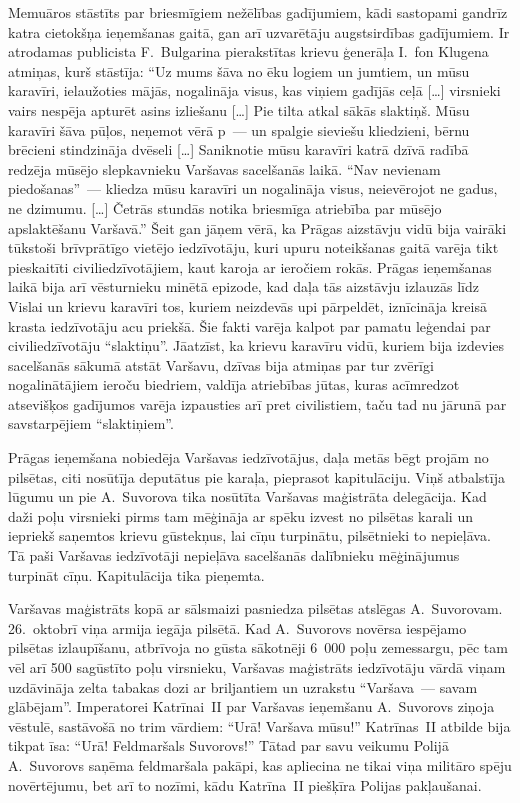 \documentclass[twoside,a5paper,12pt,fleqn,openany]{extbook}
\newcommand{\citespace}{[\dots{}]}
\begin{document}
Memuāros stāstīts par briesmīgiem nežēlības gadījumiem, kādi sastopami gandrīz katra cietokšņa ieņemšanas gaitā, gan arī uzvarētāju augstsirdības gadījumiem. Ir atrodamas publicista F.~Bulgarina pierakstītas krievu ģenerāļa I.~fon Klugena atmiņas, kurš stāstīja: ``Uz mums šāva no ēku logiem un jumtiem, un mūsu karavīri, ielaužoties mājās, nogalināja visus, kas viņiem gadījās ceļā \citespace{} virsnieki vairs nespēja apturēt asins izliešanu \citespace{} Pie tilta atkal sākās slaktiņš. Mūsu karavīri šāva pūļos, neņemot vērā p~--- un spalgie sieviešu kliedzieni, bērnu brēcieni stindzināja dvēseli \citespace{} Saniknotie mūsu karavīri katrā dzīvā radībā redzēja mūsējo slepkavnieku Varšavas sacelšanās laikā. ``Nav nevienam piedošanas''~--- kliedza mūsu karavīri un nogalināja visus, neievērojot ne gadus, ne dzimumu. \citespace{} Četrās stundās notika briesmīga atriebība par mūsējo apslaktēšanu Varšavā.'' Šeit gan jāņem vērā, ka Prāgas aizstāvju vidū bija vairāki tūkstoši brīvprātīgo vietējo iedzīvotāju, kuri upuru noteikšanas gaitā varēja tikt pieskaitīti civiliedzīvotājiem, kaut karoja ar ieročiem rokās. Prāgas ieņemšanas laikā bija arī vēsturnieku minētā epizode, kad daļa tās aizstāvju izlauzās līdz Vislai un krievu karavīri tos, kuriem neizdevās upi pārpeldēt, iznīcināja kreisā krasta iedzīvotāju acu priekšā. Šie fakti varēja kalpot par pamatu leģendai par civiliedzīvotāju ``slaktiņu''. Jāatzīst, ka krievu karavīru vidū, kuriem bija izdevies sacelšanās sākumā atstāt Varšavu, dzīvas bija atmiņas par tur zvērīgi nogalinātājiem ieroču biedriem, valdīja atriebības jūtas, kuras acīmredzot atsevišķos gadījumos varēja izpausties arī pret civilistiem, taču tad nu jārunā par savstarpējiem ``slaktiņiem''.

Prāgas ieņemšana nobiedēja Varšavas iedzīvotājus, daļa metās bēgt projām no pilsētas, citi nosūtīja deputātus pie karaļa, pieprasot kapitulāciju. Viņš atbalstīja lūgumu un pie A.~Suvorova tika nosūtīta Varšavas maģistrāta delegācija. Kad daži poļu virsnieki pirms tam mēģināja ar spēku izvest no pilsētas karali un iepriekš saņemtos krievu gūstekņus, lai cīņu turpinātu, pilsētnieki to nepieļāva. Tā paši Varšavas iedzīvotāji nepieļāva sacelšanās dalībnieku mēģinājumus turpināt cīņu. Kapitulācija tika pieņemta.

Varšavas maģistrāts kopā ar sālsmaizi pasniedza pilsētas atslēgas A.~Suvorovam. 26.~oktobrī viņa armija iegāja pilsētā. Kad A.~Suvorovs novērsa iespējamo pilsētas izlaupīšanu, atbrīvoja no gūsta sākotnēji 6~000 poļu zemessargu, pēc tam vēl arī 500 sagūstīto poļu virsnieku, Varšavas maģistrāts iedzīvotāju vārdā viņam uzdāvināja zelta tabakas dozi ar briljantiem un uzrakstu ``Varšava~--- savam glābējam''. Imperatorei Katrīnai~II par Varšavas ieņemšanu A.~Suvorovs ziņoja vēstulē, sastāvošā no trim vārdiem: ``Urā! Varšava mūsu!'' Katrīnas~II atbilde bija tikpat īsa: ``Urā! Feldmaršals Suvorovs!'' Tātad par savu veikumu Polijā A.~Suvorovs saņēma feldmaršala pakāpi, kas apliecina ne tikai viņa militāro spēju novērtējumu, bet arī to nozīmi, kādu Katrīna~II piešķīra Polijas pakļaušanai.
\end{document}
